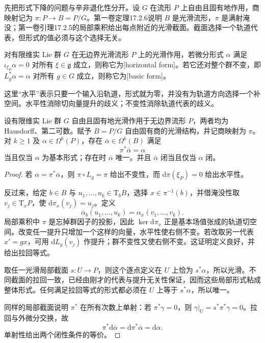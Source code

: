 先把形式下降的问题与辛非退化性分开。设 \(G\) 在流形 \(P\) 上自由且固有地作用，商映射记为 \(\pi:P\to B=P/G\)。第一卷定理17.2.6说明 \(B\) 是光滑流形，\(\pi\) 是满射淹没；第一卷引理17.2.5的局部乘积给出每点附近的光滑截面。截面选择一个轨道代表，但形式的值必须与这个选择无关。

\begin{definition}\label{g4:def:1002:basic-form}
	对有限维实 Lie 群 \(G\) 在无边界光滑流形 \(P\) 上的光滑作用，若微分形式 \(\alpha\) 满足 \(\iota_{\xi_P}\alpha=0\) 对所有 \(\xi\in\mathfrak g\) 成立，则称它为[horizontal form]。若它还对整个群不变，即 \(L_g^*\alpha=\alpha\) 对所有 \(g\in G\) 成立，则称它为[basic form]。
\end{definition}

这里“水平”表示只要一个输入沿轨道，形式就为零，并没有为轨道方向选择一个补空间。水平性消除切向量提升的歧义；不变性消除轨道代表的歧义。

\begin{proposition}\label{g4:prop:1002:basic-descent}
	设有限维实 Lie 群 \(G\) 自由且固有地光滑作用于无边界流形 \(P\)，两者均为 Hausdorff、第二可数。赋予 \(B=P/G\) 自由固有商的光滑结构，并记商映射为 \(\pi\)。对 \(k\ge1\) 及 \(\alpha\in\Omega^k(P)\)，存在 \(\overline\alpha\in\Omega^k(B)\) 满足
	\begin{equation}\label{g4:eq:1002:basic-descent}
		\pi^*\overline\alpha=\alpha
	\end{equation}
	当且仅当 \(\alpha\) 为基本形式；存在时 \(\overline\alpha\) 唯一。并且 \(\overline\alpha\) 闭当且仅当 \(\alpha\) 闭。
\end{proposition}
\begin{proof}
	若 \(\alpha=\pi^*\overline\alpha\)，则 \(\pi\circ L_g=\pi\) 给出不变性，而 \(\mathrm{d}\pi(\xi_P)=0\) 给出水平性。

	反过来，给定 \(b\in B\) 与 \(u_1,\ldots,u_k\in\mathrm{T}_bB\)，选择 \(x\in\pi^{-1}(b)\)，并借淹没性取 \(v_j\in\mathrm{T}_xP\)，使 \(\mathrm{d}\pi_x(v_j)=u_j\)。定义
	\[
		\overline\alpha_b(u_1,\ldots,u_k)
		=\alpha_x(v_1,\ldots,v_k).
	\]
	局部乘积中 \(\pi\) 是忘掉群因子的投影，因此 \(\ker\mathrm{d}\pi_x\) 正是基本场值张成的轨道切空间。改变任一提升只增加一个这样的向量，水平性使右侧不变。若改取另一代表 \(x'=gx\)，可用 \(\mathrm{d}L_g(v_j)\) 作提升；群不变性又使右侧不变。这证明定义良好，并给出拉回等式。

	取任一光滑局部截面 \(s:U\to P\)，则这个逐点定义在 \(U\) 上恰为 \(s^*\alpha\)，所以光滑。不同截面的拉回一致，已经由刚才的代表与提升无关性保证，因而这些局部形式粘成整体形式。任何满足拉回等式的形式都必须在 \(U\) 上等于 \(s^*\alpha\)，所以唯一。

	同样的局部截面说明 \(\pi^*\) 在所有次数上单射：若 \(\pi^*\gamma=0\)，则 \(\gamma|_U=s^*\pi^*\gamma=0\)。拉回与外微分交换，故
	\[
		\pi^*\mathrm{d}\overline\alpha
		=\mathrm{d}\pi^*\overline\alpha
		=\mathrm{d}\alpha.
	\]
	单射性给出两个闭性条件的等价。
\end{proof}

